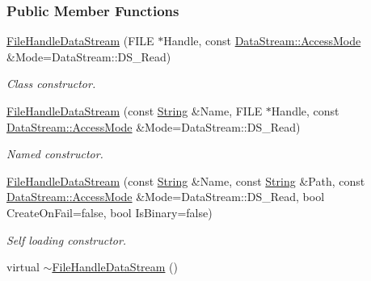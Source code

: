 \subsubsection*{Public Member Functions}
\begin{DoxyCompactItemize}
\item 
\hyperlink{classMezzanine_1_1Resource_1_1FileHandleDataStream_aabb452213e54bdf1d6b2327382587c85}{FileHandleDataStream} (FILE $\ast$Handle, const \hyperlink{classMezzanine_1_1Resource_1_1DataStream_afe2916e4ed8c06130d032d99c5a532f2}{DataStream::AccessMode} \&Mode=DataStream::DS\_\-Read)
\begin{DoxyCompactList}\small\item\em Class constructor. \item\end{DoxyCompactList}\item 
\hyperlink{classMezzanine_1_1Resource_1_1FileHandleDataStream_aca6cd766dbf8a6d7c97dcaf197a65474}{FileHandleDataStream} (const \hyperlink{namespaceMezzanine_acf9fcc130e6ebf08e3d8491aebcf1c86}{String} \&Name, FILE $\ast$Handle, const \hyperlink{classMezzanine_1_1Resource_1_1DataStream_afe2916e4ed8c06130d032d99c5a532f2}{DataStream::AccessMode} \&Mode=DataStream::DS\_\-Read)
\begin{DoxyCompactList}\small\item\em Named constructor. \item\end{DoxyCompactList}\item 
\hyperlink{classMezzanine_1_1Resource_1_1FileHandleDataStream_a719a6d2600f7f4228d44cbfcf961acc5}{FileHandleDataStream} (const \hyperlink{namespaceMezzanine_acf9fcc130e6ebf08e3d8491aebcf1c86}{String} \&Name, const \hyperlink{namespaceMezzanine_acf9fcc130e6ebf08e3d8491aebcf1c86}{String} \&Path, const \hyperlink{classMezzanine_1_1Resource_1_1DataStream_afe2916e4ed8c06130d032d99c5a532f2}{DataStream::AccessMode} \&Mode=DataStream::DS\_\-Read, bool CreateOnFail=false, bool IsBinary=false)
\begin{DoxyCompactList}\small\item\em Self loading constructor. \item\end{DoxyCompactList}\item 
\hypertarget{classMezzanine_1_1Resource_1_1FileHandleDataStream_a81bc3f29de8752cb84d33ba5d09328e7}{
virtual \hyperlink{classMezzanine_1_1Resource_1_1FileHandleDataStream_a81bc3f29de8752cb84d33ba5d09328e7}{$\sim$FileHandleDataStream} ()}
\label{classMezzanine_1_1Resource_1_1FileHandleDataStream_a81bc3f29de8752cb84d33ba5d09328e7}


\end{DoxyCompactItemize}
